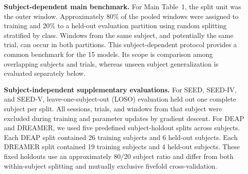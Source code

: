 \documentclass[12pt]{article}
\providecommand{\DIFaddtex}[1]{{\protect\color{blue}\sf #1}}
\providecommand{\DIFadd}[1]{\texorpdfstring{\DIFaddtex{#1}}{#1}}
\providecommand{\DIFaddend}{}
\providecommand{\DIFaddFL}[1]{\DIFadd{#1}}
\begin{document}
\begin{table}[h]
\centering
\caption{\DIFaddFL{Dataset composition and evaluation protocols. The ``4/4/1'', ``9/9/1.5'', and ``9/9/1'' entries denote outer-window duration/stride/PSE-bin length in seconds.}}
\label{tab:eval_protocol}
\scriptsize
\renewcommand{\arraystretch}{1.25}
\setlength{\tabcolsep}{3pt}
\end{table}

\DIFadd{\textbf{Subject-dependent main benchmark.}
For Main Table~1, the split unit was the outer window. Approximately 80\% of the pooled windows were assigned to training and 20\% to a held-out evaluation partition using random splitting stratified by class. Windows from the same subject, and potentially the same trial, can occur in both partitions. This subject-dependent protocol provides a common benchmark for the 15 models. Its scope is comparison among overlapping subjects and trials, whereas unseen subject generalization is evaluated separately below.
}

\DIFadd{\textbf{Subject-independent supplementary evaluations.}
For SEED, SEED-IV, and SEED-V, leave-one-subject-out (LOSO) evaluation held out one complete subject per split. All sessions, trials, and windows from that subject were excluded during training and parameter updates by gradient descent. For DEAP and DREAMER, we used five predefined subject-holdout splits across subjects. Each DEAP split contained 26 training subjects and 6 held-out subjects. Each DREAMER split contained 19 training subjects and 4 held-out subjects. These fixed holdouts use an approximately 80/20 subject ratio and differ from both within-subject splitting and mutually exclusive fivefold cross-validation}\DIFaddend .
\end{document}
